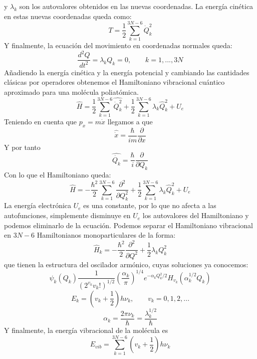 \documentclass[a4paper]{article}
\begin{document}
 y $\lambda_k$ son los autovalores obtenidos en las nuevas coordenadas.
La energía cinética en estas nuevas coordenadas queda como:
\begin{equation}
T=\frac{1}{2}\sum_{k=1}^{3N-6}\dot Q_k^2
\end{equation}
Y finalmente, la ecuación del movimiento en coordenadas normales queda:
\begin{equation}
\frac{d^2Q}{dt^2}=\lambda_kQ_k=0, \qquad k=1,...,3N
\end{equation}
Añadiendo la energía cinética y la energía potencial y cambiando las cantidades clásicas por operadores obtenemos el Hamiltoniano vibracional cuántico aproximado para una molécula poliatómica.
\begin{equation}
\hat H= \frac{1}{2}\sum_{k=1}^{3N-6} \hat{\dot Q_k^2} + \frac{1}{2} \sum_{k=1}^{3N-6} \lambda_k \hat Q_k^2 + U_e
\end{equation}
Teniendo en cuenta que $p_x=m\dot x$ llegamos a que
$$\hat{\dot{x}}=\frac{\hbar}{im}\frac{\partial}{\partial x}$$
Y por tanto
\begin{equation}
\hat{\dot{Q_k}}=\frac{\hbar}{i}\frac{\partial}{\partial Q_k}
\end{equation}
Con lo que el Hamiltoniano queda:
\begin{equation}
\hat H= -\frac{\hbar^2}{2}\sum_{k=1}^{3N-6} \frac{\partial^2}{\partial Q^2_k} + \frac{1}{2} \sum_{k=1}^{3N-6} \lambda_k \hat Q_k^2 + U_e
\end{equation}
La energía electrónica $U_e$ es una constante, por lo que no afecta a las autofunciones, simplemente disminuye en $U_e$ los autovalores del Hamiltoniano y podemos eliminarlo de la ecuación. Podemos separar el Hamiltoniano vibracional en $3N-6$ Hamiltonianos monoparticulares de la forma:
\begin{equation}
\hat H_k = -\frac{\hbar^2}{2}\frac{\partial^2}{\partial Q^2}+\frac{1}{2}\lambda_kQ_k^2
\end{equation}
que tienen la estructura del oscilador armónico, cuyas soluciones ya conocemos:
\begin{equation}
\psi_k(Q_k)\frac{1}{\left(2^{v_k}v_k!\right)^{1/2}}\left(\frac{\alpha_k}{\pi}\right)^{1/4}e^{-\alpha_kQ^2_k/2}H_{v_k}(\alpha_k^{1/2}Q_k)
\end{equation}
\begin{equation}
E_k=\left(v_k+\frac{1}{2}\right)h\nu_k,	\qquad v_k=0,1,2,...
\end{equation}
\begin{equation}
\alpha_k=\frac{2\pi\nu_k}{\hbar}=\frac{\lambda_k^{1/2}}{\hbar}
\end{equation}
Y finalmente, la energía vibracional de la molécula es
\begin{equation}
E_{vib}=\sum_{k=1}^{3N-6}\left(v_k+\frac{1}{2}\right)h\nu_k
\end{equation}
\end{document}
